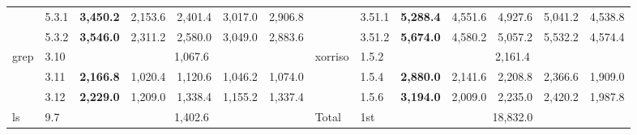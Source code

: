 \begin{table}[]
{\begin{tabular}{l|l|rrrrr||l|l|rrrrr}
                            & 5.3.1   & \multicolumn{1}{r|}{\textbf{3,450.2}} & \multicolumn{1}{r|}{2,153.6} & \multicolumn{1}{r|}{2,401.4} & \multicolumn{1}{r|}{3,017.0} & 2,906.8                    &                          & 3.51.1  & \multicolumn{1}{r|}{\textbf{5,288.4}}  & \multicolumn{1}{r|}{4,551.6}  & \multicolumn{1}{r|}{4,927.6}  & \multicolumn{1}{r|}{5,041.2}  & 4,538.8                   \\ \cmidrule(lr){2-7} \cmidrule{9-14} 
                            & 5.3.2   & \multicolumn{1}{r|}{\textbf{3,546.0}} & \multicolumn{1}{r|}{2,311.2} & \multicolumn{1}{r|}{2,580.0} & \multicolumn{1}{r|}{3,049.0} & 2,883.6                    &                          & 3.51.2  & \multicolumn{1}{r|}{\textbf{5,674.0}}  & \multicolumn{1}{r|}{4,580.2}  & \multicolumn{1}{r|}{5,057.2}  & \multicolumn{1}{r|}{5,532.2}  & 4,574.4                   \\ \midrule
    \multirow{3}{*}{grep}   & 3.10    & \multicolumn{5}{c||}{1,067.6}                                                                                                                           & \multirow{3}{*}{xorriso} & 1.5.2   & \multicolumn{5}{c}{2,161.4}                                                                                                                               \\ \cmidrule(lr){2-7} \cmidrule{9-14} 
                            & 3.11    & \multicolumn{1}{r|}{\textbf{2,166.8}} & \multicolumn{1}{r|}{1,020.4} & \multicolumn{1}{r|}{1,120.6} & \multicolumn{1}{r|}{1,046.2} & 1,074.0                    &                          & 1.5.4   & \multicolumn{1}{r|}{\textbf{2,880.0}}  & \multicolumn{1}{r|}{2,141.6}  & \multicolumn{1}{r|}{2,208.8}  & \multicolumn{1}{r|}{2,366.6}  & 1,909.0                   \\ \cmidrule(lr){2-7} \cmidrule{9-14} 
                            & 3.12    & \multicolumn{1}{r|}{\textbf{2,229.0}} & \multicolumn{1}{r|}{1,209.0} & \multicolumn{1}{r|}{1,338.4} & \multicolumn{1}{r|}{1,155.2} & 1,337.4                    &                          & 1.5.6   & \multicolumn{1}{r|}{\textbf{3,194.0}}  & \multicolumn{1}{r|}{2,009.0}  & \multicolumn{1}{r|}{2,235.0}  & \multicolumn{1}{r|}{2,420.2}  & 1,987.8                   \\ \midrule
    \multirow{3}{*}{ls}     & 9.7     & \multicolumn{5}{c||}{1,402.6}                                                                                                                           & \multirow{3}{*}{Total}   & 1st     & \multicolumn{5}{c}{18,832.0}                                                                                                                              \\ \cmidrule(lr){2-7} \cmidrule{9-14} 

\end{tabular}}
\end{table}
